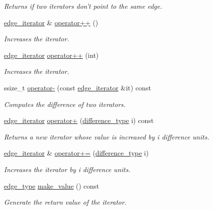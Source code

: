 \begin{DoxyCompactItemize}
\begin{DoxyCompactList}\small\item\em Returns if two iterators don't point to the same edge. \end{DoxyCompactList}\item 
\hyperlink{classsaedb_1_1graph__storage_1_1edge__iterator}{edge\-\_\-iterator} \& \hyperlink{classsaedb_1_1graph__storage_1_1edge__iterator_a6af7e5e5e706480086b58138d943df8f}{operator++} ()
\begin{DoxyCompactList}\small\item\em Increases the iterator. \end{DoxyCompactList}\item 
\hyperlink{classsaedb_1_1graph__storage_1_1edge__iterator}{edge\-\_\-iterator} \hyperlink{classsaedb_1_1graph__storage_1_1edge__iterator_a1f88307cf3082cbf763c0a0767470a4b}{operator++} (int)
\begin{DoxyCompactList}\small\item\em Increases the iterator. \end{DoxyCompactList}\item 
ssize\-\_\-t \hyperlink{classsaedb_1_1graph__storage_1_1edge__iterator_a6a0cdf3ee29e88ba320ef3b4a11498ee}{operator-\/} (const \hyperlink{classsaedb_1_1graph__storage_1_1edge__iterator}{edge\-\_\-iterator} \&it) const 
\begin{DoxyCompactList}\small\item\em Computes the difference of two iterators. \end{DoxyCompactList}\item 
\hyperlink{classsaedb_1_1graph__storage_1_1edge__iterator}{edge\-\_\-iterator} \hyperlink{classsaedb_1_1graph__storage_1_1edge__iterator_aefc37786296b0b3f8eec6000256f0710}{operator+} (\hyperlink{classsaedb_1_1graph__storage_1_1edge__iterator_a36e4780cec6028b4af8cb4e34b8de5b4}{difference\-\_\-type} i) const 
\begin{DoxyCompactList}\small\item\em Returns a new iterator whose value is increased by i difference units. \end{DoxyCompactList}\item 
\hyperlink{classsaedb_1_1graph__storage_1_1edge__iterator}{edge\-\_\-iterator} \& \hyperlink{classsaedb_1_1graph__storage_1_1edge__iterator_ad97b0775bb8aaeca052a88baf080a9aa}{operator+=} (\hyperlink{classsaedb_1_1graph__storage_1_1edge__iterator_a36e4780cec6028b4af8cb4e34b8de5b4}{difference\-\_\-type} i)
\begin{DoxyCompactList}\small\item\em Increases the iterator by i difference units. \end{DoxyCompactList}\item 
\hyperlink{classsaedb_1_1graph__storage_1_1edge__type}{edge\-\_\-type} \hyperlink{classsaedb_1_1graph__storage_1_1edge__iterator_a9f264f29debdb6bf71a6180bf3e23009}{make\-\_\-value} () const 
\begin{DoxyCompactList}\small\item\em Generate the return value of the iterator. \end{DoxyCompactList}\end{DoxyCompactItemize}


